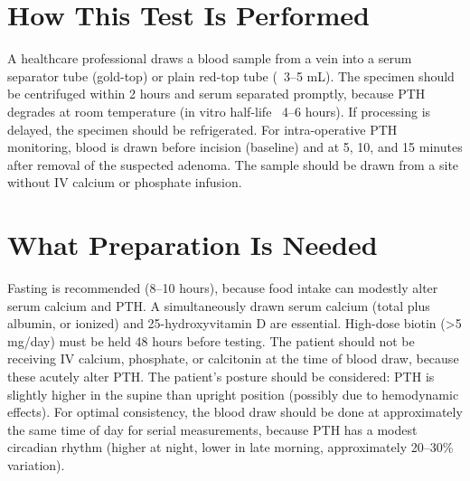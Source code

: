 \section*{How This Test Is Performed}
A healthcare professional draws a blood sample from a vein into a serum separator tube (gold-top) or plain red-top tube (~3--5 mL). The specimen should be centrifuged within 2 hours and serum separated promptly, because PTH degrades at room temperature (in vitro half-life ~4--6 hours). If processing is delayed, the specimen should be refrigerated. For intra-operative PTH monitoring, blood is drawn before incision (baseline) and at 5, 10, and 15 minutes after removal of the suspected adenoma. The sample should be drawn from a site without IV calcium or phosphate infusion.

\section*{What Preparation Is Needed}
Fasting is recommended (8--10 hours), because food intake can modestly alter serum calcium and PTH. A simultaneously drawn serum calcium (total plus albumin, or ionized) and 25-hydroxyvitamin D are essential. High-dose biotin (>5 mg/day) must be held 48 hours before testing. The patient should not be receiving IV calcium, phosphate, or calcitonin at the time of blood draw, because these acutely alter PTH. The patient's posture should be considered: PTH is slightly higher in the supine than upright position (possibly due to hemodynamic effects). For optimal consistency, the blood draw should be done at approximately the same time of day for serial measurements, because PTH has a modest circadian rhythm (higher at night, lower in late morning, approximately 20--30\% variation).

